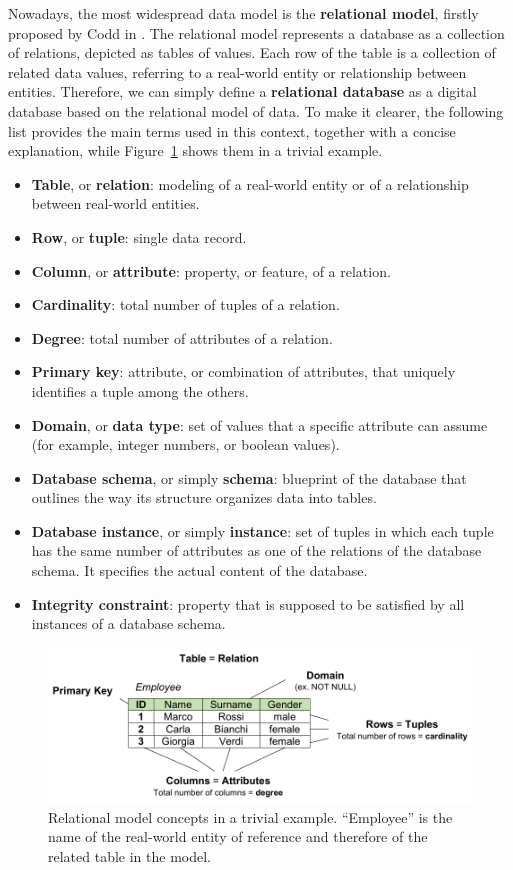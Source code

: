 Nowadays, the most widespread data model is the \textbf{relational model}, firstly proposed by Codd in \cite{codd1970relational}. The relational model represents a database as a collection of relations, depicted as tables of values. Each row of the table is a collection of related data values, referring to a real-world entity or relationship between entities. Therefore, we can simply define a \textbf{relational database} as a digital database based on the relational model of data.
To make it clearer, the following list provides the main terms used in this context, together with a concise explanation, while Figure~\ref{fig:relational_model} shows them in a trivial example.
\begin{itemize}
\item \textbf{Table}, or \textbf{relation}: modeling of a real-world entity or of a relationship between real-world entities.
\item \textbf{Row}, or \textbf{tuple}: single data record.
\item \textbf{Column}, or \textbf{attribute}: property, or feature, of a relation.
\item \textbf{Cardinality}: total number of tuples of a relation.
\item \textbf{Degree}: total number of attributes of a relation.
\item \textbf{Primary key}: attribute, or combination of attributes, that uniquely identifies a tuple among the others.
\item \textbf{Domain}, or \textbf{data type}: set of values that a specific attribute can assume (for example, integer numbers, or boolean values).
\item \textbf{Database schema}, or simply \textbf{schema}: blueprint of the database that outlines the way its structure organizes data into tables.
\item \textbf{Database instance}, or simply \textbf{instance}: set of tuples in which each tuple has the same number of attributes as one of the relations of the database schema. It specifies the actual content of the database.
\item \textbf{Integrity constraint}: property that is supposed to be satisfied by all instances of a database schema.
\end{itemize} 

\begin{figure}[h!]
\includegraphics[scale=.75]{figures/relational_model.pdf}
\centering
\caption{Relational model concepts in a trivial example. ``Employee'' is the name of the real-world entity of reference and therefore of the related table in the model.}
\label{fig:relational_model}
\end{figure}

